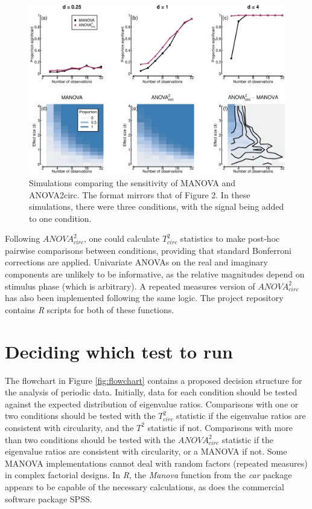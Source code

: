 \documentclass[]{article}
\begin{document}
\begin{figure}

{\centering \includegraphics{manuscript_files/figure-latex/powerfig2-1} 

}

\caption{Simulations comparing the sensitivity of MANOVA and ANOVA2circ. The format mirrors that of Figure 2. In these simulations, there were three conditions, with the signal being added to one condition.}\label{fig:powerfig2}
\end{figure}

Following \({ANOVA}^2_{circ}\), one could calculate \(T^2_{circ}\) statistics to make post-hoc pairwise comparisons between conditions, providing that standard Bonferroni corrections are applied. Univariate ANOVAs on the real and imaginary components are unlikely to be informative, as the relative magnitudes depend on stimulus phase (which is arbitrary). A repeated measures version of \({ANOVA}^2_{circ}\) has also been implemented following the same logic. The project repository contains \emph{R} scripts for both of these functions.

\hypertarget{deciding-which-test-to-run}{%
\section{Deciding which test to run}\label{deciding-which-test-to-run}}

The flowchart in Figure \ref{fig:flowchart} contains a proposed decision structure for the analysis of periodic data. Initially, data for each condition should be tested against the expected distribution of eigenvalue ratios. Comparisons with one or two conditions should be tested with the \(T^2_{circ}\) statistic if the eigenvalue ratios are consistent with circularity, and the \(T^2\) statistic if not. Comparisons with more than two conditions should be tested with the \(ANOVA^2_{circ}\) statistic if the eigenvalue ratios are consistent with circularity, or a MANOVA if not. Some MANOVA implementations cannot deal with random factors (repeated measures) in complex factorial designs. In \emph{R}, the \emph{Manova} function from the \emph{car} package appears to be capable of the necessary calculations, as does the commercial software package SPSS.
\end{document}
